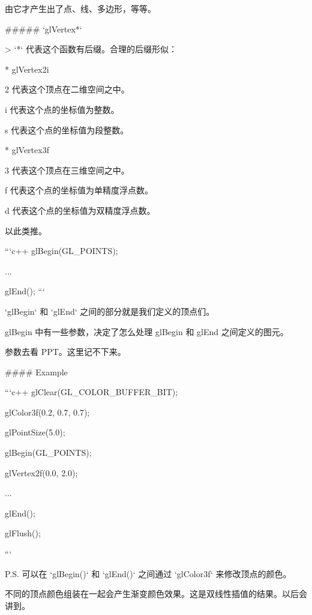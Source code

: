 \documentclass[
]{article}
\newenvironment{Shaded}{}{}
\newcommand{\BaseNTok}[1]{\textcolor[rgb]{0.25,0.63,0.44}{#1}}
\newcommand{\DataTypeTok}[1]{\textcolor[rgb]{0.56,0.13,0.00}{#1}}
\newcommand{\FunctionTok}[1]{\textcolor[rgb]{0.02,0.16,0.49}{#1}}
\newcommand{\NormalTok}[1]{#1}
\newcommand{\StringTok}[1]{\textcolor[rgb]{0.25,0.44,0.63}{#1}}
\begin{document}
\begin{Shaded}
\begin{Highlighting}[]
\NormalTok{由它才产生出了点、线、多边形，等等。}

\FunctionTok{##### `glVertex*`}

\NormalTok{>}\DataTypeTok{ }\BaseNTok{`*`}\DataTypeTok{ 代表这个函数有后缀。合理的后缀形似：}

\NormalTok{* }\StringTok{glVertex2i}

\NormalTok{2 代表这个顶点在二维空间之中。}

\NormalTok{i 代表这个点的坐标值为整数。}

\NormalTok{s 代表这个点的坐标值为段整数。}

\NormalTok{* }\StringTok{glVertex3f}

\NormalTok{3 代表这个顶点在三维空间之中。}

\NormalTok{f 代表这个点的坐标值为单精度浮点数。}

\NormalTok{d 代表这个点的坐标值为双精度浮点数。}

\NormalTok{以此类推。}

\BaseNTok{```c++}
\BaseNTok{glBegin(GL_POINTS);}

\BaseNTok{...}

\BaseNTok{glEnd();}
\BaseNTok{```}

\BaseNTok{`glBegin`}\NormalTok{ 和 }\BaseNTok{`glEnd`}\NormalTok{ 之间的部分就是我们定义的顶点们。}

\NormalTok{glBegin 中有一些参数，决定了怎么处理 glBegin 和 glEnd 之间定义的图元。}

\NormalTok{参数去看 PPT。这里记不下来。}

\FunctionTok{#### Example}

\BaseNTok{```c++}
\BaseNTok{glClear(GL_COLOR_BUFFER_BIT);}

\BaseNTok{glColor3f(0.2, 0.7, 0.7);}

\BaseNTok{glPointSize(5.0);}

\BaseNTok{glBegin(GL_POINTS);}

\BaseNTok{glVertex2f(0.0, 2.0);}

\BaseNTok{...}

\BaseNTok{glEnd();}

\BaseNTok{glFlush();}

\BaseNTok{```}

\NormalTok{P.S. 可以在 }\BaseNTok{`glBegin()`}\NormalTok{ 和 }\BaseNTok{`glEnd()`}\NormalTok{ 之间通过 }\BaseNTok{`glColor3f`}\NormalTok{ 来修改顶点的颜色。}

\NormalTok{不同的顶点颜色组装在一起会产生渐变颜色效果。这是双线性插值的结果。以后会讲到。}


\end{Highlighting}
\end{Shaded}
\end{document}

